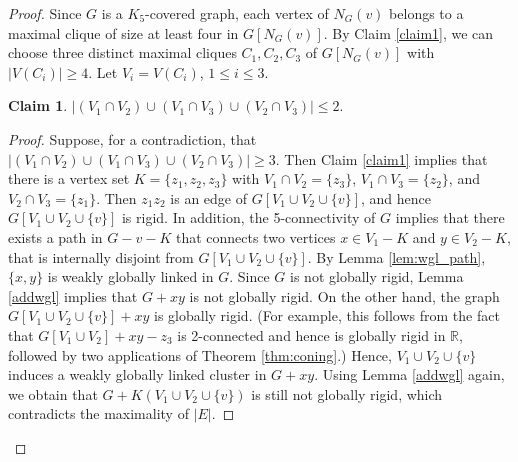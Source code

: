\documentclass[11pt,a4paper]{article}
\theoremstyle{definition}
\newtheorem{claim}[theorem]{Claim}
\newcommand{\R}{\mathbb{R}}
\begin{document}
\begin{proof}
    Since $G$ is a $K_5$-covered graph, each vertex of $N_G(v)$ belongs to
    a maximal clique of size at least four in $G[N_G(v)]$.
    By Claim \ref{claim1}, we can choose three distinct maximal cliques 
    $C_1,C_2,C_3$ of $G[N_G(v)]$ with $|V(C_i)|\geq 4$.
    Let $V_i=V(C_i)$, $1\leq i\leq 3$.
    
    \begin{claim}
        \label{claim2}
        $|(V_1\cap V_2)\cup (V_1\cap V_3)\cup (V_2\cap V_3)|\leq 2$.
    \end{claim}
    
    \begin{proof}
                Suppose, for a contradiction,  that $|(V_1\cap V_2)\cup (V_1\cap V_3)\cup (V_2\cap V_3)|\geq 3$.
        Then Claim \ref{claim1} implies that there is a vertex set $K=\{z_1,z_2,z_3\}$
        with $V_1\cap V_2=\{z_3\}$, $V_1\cap V_3=\{z_2\}$, and
        $V_2\cap V_3=\{z_1\}$. 
        Then $z_1z_2$ is an edge of $G[V_1\cup V_2\cup \{v\}]$, and 
        hence $G[V_1\cup V_2\cup \{v\}]$ is rigid. 
        In addition, the 5-connectivity of $G$ implies that there exists a path in $G-v-K$ that connects two vertices  $x\in V_1-K$ and $y\in V_2-K$, that is
        internally disjoint from $G[V_1\cup V_2\cup \{v\}]$.
        By Lemma \ref{lem:wgl_path}, $\{x,y\}$ is weakly globally linked in $G$.
        Since $G$ is not globally rigid, Lemma \ref{addwgl}
        implies that $G+xy$ is not globally rigid. 
        On the other hand, the graph $G[V_1\cup V_2\cup \{v\}]+xy$ is globally rigid. (For example, this follows from the fact that $G[V_1\cup V_2]+xy-z_3$ is 2-connected and hence is globally rigid in $\R$, followed by two applications of Theorem \ref{thm:coning}.)
        Hence, $V_1\cup V_2\cup \{v\}$ induces a weakly globally linked cluster in $G+xy$.
        Using Lemma \ref{addwgl} again, we obtain that $G+K(V_1\cup V_2\cup \{v\})$ is still not globally rigid, which contradicts the maximality of $|E|$.
    \end{proof}
    

\end{proof}
\end{document}
